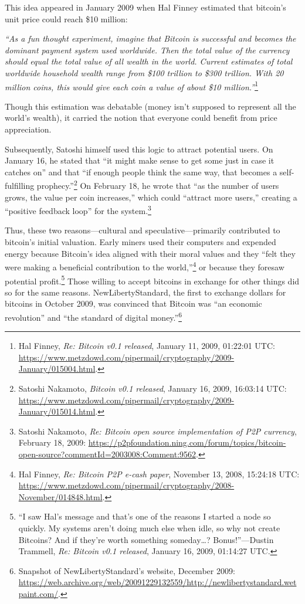 \documentclass[
  a5paper,
  smalldemyvopaper,10pt,twoside,onecolumn,openright,extrafontsizes,hidelinks]{memoir}
\begin{document}
This idea appeared in January 2009 when Hal Finney estimated that
bitcoin's unit price could reach \$10 million:

\emph{``As a fun thought experiment, imagine that Bitcoin is successful
and becomes the dominant payment system used worldwide. Then the total
value of the currency should equal the total value of all wealth in the
world. Current estimates of total worldwide household wealth range from
\$100 trillion to \$300 trillion. With 20 million coins, this would give
each coin a value of about \$10 million.''}\footnote{Hal Finney,
  \emph{Re: Bitcoin v0.1 released}, January 11, 2009, 01:22:01 UTC:
  \url{https://www.metzdowd.com/pipermail/cryptography/2009-January/015004.html}.}

Though this estimation was debatable (money isn't supposed to represent
all the world's wealth), it carried the notion that everyone could
benefit from price appreciation.

Subsequently, Satoshi himself used this logic to attract potential
users. On January 16, he stated that ``it might make sense to get some
just in case it catches on'' and that ``if enough people think the same
way, that becomes a self-fulfilling prophecy.''\footnote{Satoshi
  Nakamoto, \emph{Bitcoin v0.1 released}, January 16, 2009, 16:03:14
  UTC:
  \url{https://www.metzdowd.com/pipermail/cryptography/2009-January/015014.html}.}
On February 18, he wrote that ``as the number of users grows, the value
per coin increases,'' which could ``attract more users,'' creating a
``positive feedback loop'' for the system.\footnote{Satoshi Nakamoto,
  \emph{Re: Bitcoin open source implementation of P2P currency},
  February 18, 2009:
  \url{https://p2pfoundation.ning.com/forum/topics/bitcoin-open-source?commentId=2003008:Comment:9562}.}

Thus, these two reasons---cultural and speculative---primarily
contributed to bitcoin's initial valuation. Early miners used their
computers and expended energy because Bitcoin's idea aligned with their
moral values and they ``felt they were making a beneficial contribution
to the world,''\footnote{Hal Finney, \emph{Re: Bitcoin P2P e-cash
  paper}, November 13, 2008, 15:24:18 UTC:
  \url{https://www.metzdowd.com/pipermail/cryptography/2008-November/014848.html}.}
or because they foresaw potential profit.\footnote{``I saw Hal's message
  and that's one of the reasons I started a node so quickly. My systems
  aren't doing much else when idle, so why not create Bitcoins? And if
  they're worth something someday\ldots? Bonus!''---Dustin Trammell,
  \emph{Re: Bitcoin v0.1 released}, January 16, 2009, 01:14:27 UTC.}
Those willing to accept bitcoins in exchange for other things did so for
the same reasons. NewLibertyStandard, the first to exchange dollars for
bitcoins in October 2009, was convinced that Bitcoin was ``an economic
revolution'' and ``the standard of digital money.''\footnote{Snapshot of
  NewLibertyStandard's website, December 2009:
  \url{https://web.archive.org/web/20091229132559/http://newlibertystandard.wetpaint.com/}.}
\end{document}
